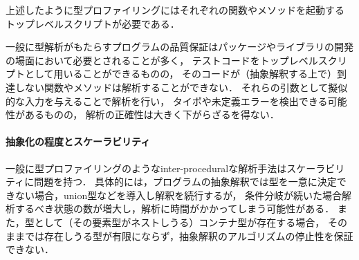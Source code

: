 上述したように型プロファイリングにはそれぞれの関数やメソッドを起動する
トップレベルスクリプトが必要である．

一般に型解析がもたらすプログラムの品質保証はパッケージやライブラリの開発の場面において必要とされることが多く，
テストコードをトップレベルスクリプトとして用いることができるものの，
そのコードが（抽象解釈する上で）到達しない関数やメソッドは解析することができない．
それらの引数として擬似的な入力を与えることで解析を行い，
タイポや未定義エラーを検出できる可能性があるものの，
解析の正確性は大きく下がらざるを得ない．

%
%
%
%
%
%

\paragraph{抽象化の程度とスケーラビリティ}

一般に型プロファイリングのようなinter-proceduralな解析手法はスケーラビリティに問題を持つ．
具体的には，プログラムの抽象解釈では型を一意に決定できない場合，union型などを導入し解釈を続行するが，
条件分岐が続いた場合解析するべき状態の数が増大し，解析に時間がかかってしまう可能性がある．
また，型として（その要素型がネストしうる）コンテナ型が存在する場合，
そのままでは存在しうる型が有限にならず，抽象解釈のアルゴリズムの停止性を保証できない．

